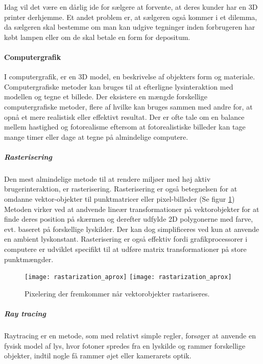 Idag vil det være en dårlig ide for sælgere at forvente, at deres kunder har en 3D printer derhjemme. Et andet problem er, at sælgeren også kommer i et dilemma, da sælgeren skal bestemme om man kan udgive tegninger inden forbrugeren har købt lampen eller om de skal betale en form for depositum.

\paragraph{Computergrafik \cite{computergrafik_introduktion}}
I computergrafik, er en 3D model, en beskrivelse af objekters form og materiale. Computergrafiske metoder kan bruges til at efterligne lysinteraktion med modellen og tegne et billede. Der eksistere en mængde forskellige computergrafiske metoder, flere af hvilke kan bruges sammen med andre for, at opnå et mere realistisk eller effektivt resultat. Der er ofte tale om en balance mellem hastighed og fotorealisme eftersom at fotorealistiske billeder kan tage mange timer eller dage at tegne på almindelige computere.

\subparagraph{Rasterisering}
Den mest almindelige metode til at rendere miljøer med høj aktiv brugerinteraktion, er rasterisering. Rasterisering er også betegnelsen for at omdanne vektor-objekter til punktmatricer eller pixel-billeder (Se figur \ref{fig:pixelering}) Metoden virker ved at andvende lineær transformationer på vektorobjekter for at finde deres position på skærmen og derefter udfylde 2D polygonerne med farve, evt. baseret på forskellige lyskilder. Der kan dog simplificeres ved kun at anvende en ambient lyskonstant. Rasterisering er også effektiv fordi grafikprocessorer i computere er udviklet specifikt til at udføre matrix transformationer på store punktmængder.
\begin{figure}[H]
    \centering
    \texttt{[image: rastarization\_aprox]}
    \texttt{[image: rastarization\_aprox]}
    \caption{Pixelering der fremkommer når vektorobjekter rastariseres.}
    \label{fig:pixelering}
\end{figure}
\subparagraph{Ray tracing \cite{raytracing_for_begyndere}}
Raytracing er en metode, som med relativt simple regler, forsøger at anvende en fysisk model af lys, hvor fotoner spredes fra en lyskilde og rammer forskellige objekter, indtil nogle få rammer øjet eller kamerarets optik. 

